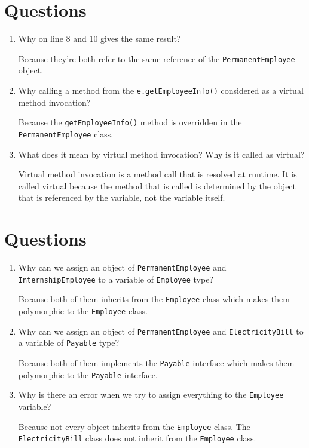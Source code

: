 \documentclass[12pt,titlepage]{article}
\begin{document}
\section{Questions}
\begin{enumerate}
    \item {
        Why on line 8 and 10 gives the same result?

        Because they're both refer to the same reference of the \texttt{PermanentEmployee} object.
    }
    \item {
        Why calling a method from the \texttt{e.getEmployeeInfo()} considered as a virtual method invocation?

        Because the \texttt{getEmployeeInfo()} method is overridden in the \texttt{PermanentEmployee} class.
    }
    \item {
        What does it mean by virtual method invocation? Why is it called as virtual?

        Virtual method invocation is a method call that is resolved at runtime. It is called virtual because the method
        that is called is determined by the object that is referenced by the variable, not the variable itself.
    }
\end{enumerate}

\section{Questions}
\begin{enumerate}
    \item {
        Why can we assign an object of \texttt{PermanentEmployee} and \texttt{InternshipEmployee} to a variable of \texttt{Employee} type?

        Because both of them inherits from the \texttt{Employee} class which makes them polymorphic to the \texttt{Employee} class.
    }
    \item {
        Why can we assign an object of \texttt{PermanentEmployee} and \texttt{ElectricityBill} to a variable of \texttt{Payable} type?

        Because both of them implements the \texttt{Payable} interface which makes them polymorphic to the \texttt{Payable} interface.
    }
    \item {
        Why is there an error when we try to assign everything to the \texttt{Employee} variable?

        Because not every object inherits from the \texttt{Employee} class. The \texttt{ElectricityBill} class does not inherit from the \texttt{Employee} class.
    }
\end{enumerate}
\end{document}
